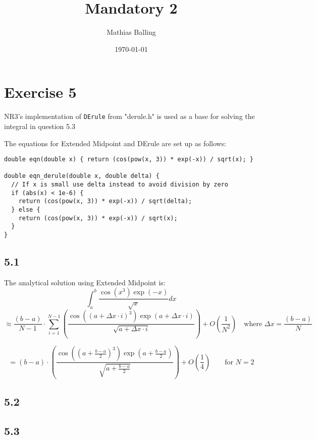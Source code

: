 \documentclass{article}
\title{Mandatory 2}
\author{Mathias Balling}
\date{\today}
\begin{document}
\maketitle

\section*{Exercise 5}
NR3's implementation of \texttt{DErule} from "derule.h" is used as a base for solving the integral in question 5.3

The equations for Extended Midpoint and DErule are set up as follows:
\begin{verbatim}
double eqn(double x) { return (cos(pow(x, 3)) * exp(-x)) / sqrt(x); }

double eqn_derule(double x, double delta) {
  // If x is small use delta instead to avoid division by zero
  if (abs(x) < 1e-6) {
    return (cos(pow(x, 3)) * exp(-x)) / sqrt(delta);
  } else {
    return (cos(pow(x, 3)) * exp(-x)) / sqrt(x);
  }
}
\end{verbatim}

\subsection*{5.1}
The analytical solution using Extended Midpoint is:
$$
\int_{a}^{b}\frac{\cos(x^3)\exp(-x)}{\sqrt{x}}dx
$$
$$
\approx
\frac{(b-a)}{N-1}\cdot\sum_{i=1}^{N-1}\left(
  \frac{
  \cos\left(\left(a+\Delta x\cdot i\right)^3\right)\exp\left(a+\Delta x\cdot i\right)
}{
  \sqrt{a+\Delta x\cdot i}
}
\right)+O\left(\frac{1}{N^2}\right)
\quad{\text{where } \Delta x=\frac{(b-a)}{N}}
$$

$$
=(b-a)\cdot\left(
  \frac{
  \cos\left(\left(a+\frac{b-a}{2}\right)^3\right)\exp\left(a+\frac{b-a}{2}\right)
}{
  \sqrt{a+\frac{b-a}{2}}
}
\right)+O\left(\frac{1}{4}\right)
\qquad{\text{for } N=2}
$$

\subsection*{5.2}
\subsection*{5.3}
\end{document}
